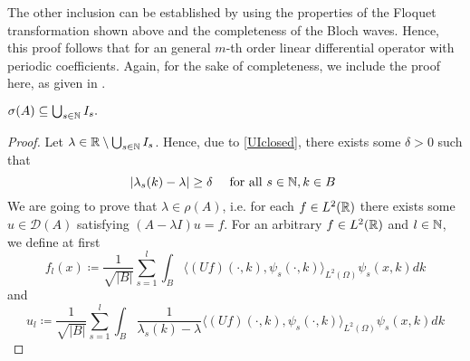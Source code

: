The other inclusion can be established by using the properties of the Floquet transformation shown above and the completeness of the Bloch waves. Hence, this proof follows that for an general $m$-th order linear differential operator with periodic coefficients. Again, for the sake of completeness, we include the proof here, as given in \cite[section 3.6]{dorfler2011photonic}.

 \begin{theorem} \label{4.1:thm-MainResult.SecondInclusion}

	$\sigma(A) \subseteq \bigcup_{s \in \mathbb{N}} I_{s}.$

	\begin{proof}
		Let $\lambda \in \mathbb{R} \setminus \bigcup_{s \in \mathbb{N}} I_{s}$. Hence, due to \eqref{UIclosed}, there exists some $\delta > 0$ such that
			\begin{equation}
				|\lambda_{s}(k) - \lambda| \geq \delta \quad \text{ for all } s \in \N, k \in B \label{lambda-distance}
			\end{equation}
		We are going to prove that $\lambda \in \rho(A)$, i.e. for each $f \in L^{2}(\mathbb{R})$ there exists some $u \in \mathcal{D}(A)$ satisfying $(A-\lambda I)u = f$. For an arbitrary $f \in L^{2}(\mathbb{R})$ and $l \in \mathbb{N}$, we define at first
			\[ f_{l}(x) \coloneqq \frac{1}{\sqrt{|B|}} \sum_{s=1}^{l} \int_{B} \langle (Uf)(\cdot, k), \psi_{s}(\cdot, k)\rangle_{L^{2}(\Omega)} \psi_{s}(x,k) dk \]
			and
			\begin{equation}
				u_{l} \coloneqq \frac{1}{\sqrt{|B|}} \sum_{s=1}^{l} \int_{B} \frac{1}{\lambda_{s}(k) - \lambda} \langle (Uf)(\cdot, k), \psi_{s}(\cdot, k)\rangle_{L^{2}(\Omega)} \psi_{s}(x, k) dk \label{ul}
			\end{equation} 


\end{proof}
\end{theorem}
